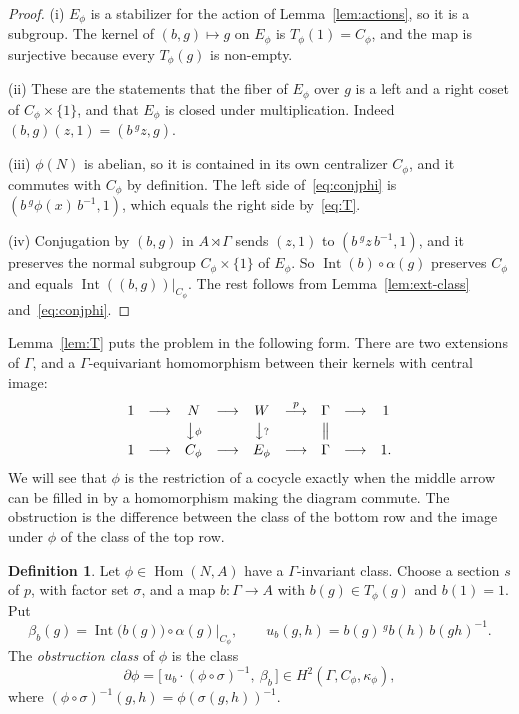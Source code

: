 \documentclass[12pt,letterpaper]{article}
\numberwithin{equation}{section}
\theoremstyle{plain}
\theoremstyle{definition}
\newtheorem{definition}[theorem]{Definition}
\newcommand{\act}[2]{{}^{#1}\!#2}          %
\DeclareMathOperator{\Hom}{Hom}
\DeclareMathOperator{\Int}{Int}
\begin{document}
\begin{proof}
(i) $E_\phi$ is a stabilizer for the action of Lemma~\ref{lem:actions}, so
it is a subgroup. The kernel of $(b,g)\mapsto g$ on $E_\phi$ is
$T_\phi(1)=C_\phi$, and the map is surjective because every $T_\phi(g)$ is
non-empty.

(ii) These are the statements that the fiber of $E_\phi$ over $g$ is a
left and a right coset of $C_\phi\times\{1\}$, and that $E_\phi$ is closed
under multiplication. Indeed $(b,g)(z,1)=(b\,\act{g}{z},g)$.

(iii) $\phi(N)$ is abelian, so it is contained in its own centralizer
$C_\phi$, and it commutes with $C_\phi$ by definition. The left side
of~\eqref{eq:conjphi} is $(b\,\act{g}{\phi(x)}\,b^{-1},1)$, which equals
the right side by~\eqref{eq:T}.

(iv) Conjugation by $(b,g)$ in $A\rtimes\Gamma$ sends $(z,1)$ to
$(b\,\act{g}{z}\,b^{-1},1)$, and it preserves the normal subgroup
$C_\phi\times\{1\}$ of $E_\phi$. So $\Int(b)\circ\alpha(g)$ preserves
$C_\phi$ and equals $\Int((b,g))|_{C_\phi}$. The rest follows from
Lemma~\ref{lem:ext-class} and~\eqref{eq:conjphi}.
\end{proof}

Lemma~\ref{lem:T} puts the problem in the following form. There are two
extensions of $\Gamma$, and a $\Gamma$-equivariant homomorphism between
their kernels with central image:
\begin{equation}\label{eq:diagram}
\begin{array}{ccccccccc}
1&\longrightarrow&N&\longrightarrow&W&\overset{p}{\longrightarrow}&\Gamma&\longrightarrow&1\\[2pt]
&&\big\downarrow{\scriptstyle\phi}&&\big\downarrow{\scriptstyle ?}&&\big\|&&\\[2pt]
1&\longrightarrow&C_\phi&\longrightarrow&E_\phi&\longrightarrow&\Gamma&\longrightarrow&1 .
\end{array}
\end{equation}
We will see that $\phi$ is the restriction of a cocycle exactly when the
middle arrow can be filled in by a homomorphism making the diagram
commute. The obstruction is the difference between the class of the
bottom row and the image under $\phi$ of the class of the top row.

\begin{definition}\label{def:partial}
Let $\phi\in\Hom(N,A)$ have a $\Gamma$-invariant class. Choose a section
$s$ of $p$, with factor set $\sigma$, and a map $b:\Gamma\to A$ with
$b(g)\in T_\phi(g)$ and $b(1)=1$. Put
\begin{equation}\label{eq:ub}
\beta_b(g)=\Int\bigl(b(g)\bigr)\circ\alpha(g)\big|_{C_\phi},\qquad
u_b(g,h)=b(g)\,\act{g}{b(h)}\,b(gh)^{-1}.
\end{equation}
The \emph{obstruction class} of $\phi$ is the class
\[
\partial\phi=\bigl[\,u_b\cdot(\phi\circ\sigma)^{-1},\ \beta_b\,\bigr]
\in H^2(\Gamma,C_\phi,\kappa_\phi),
\]
where $(\phi\circ\sigma)^{-1}(g,h)=\phi(\sigma(g,h))^{-1}$.
\end{definition}
\end{document}
